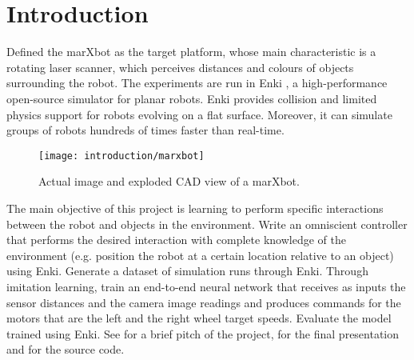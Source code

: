 \section{Introduction}
Defined the marXbot \cite{bonani2010marxbot} as the target platform, whose main 
characteristic is a rotating laser scanner, which perceives distances and 
colours of objects surrounding the robot. The experiments are run in Enki  
\cite{enki}, a high-performance open-source simulator for planar robots. Enki 
provides collision and limited physics support for robots evolving on a flat 
surface. 
Moreover, it can simulate groups of robots hundreds of times faster than real-time.

\begin{figure}[htbp]
	\centerline{\texttt{[image: introduction/marxbot]}}
	\caption{Actual image and exploded CAD view of a marXbot.}
	\label{fig:marxbot}
\end{figure}

The main objective of this project is learning to perform specific interactions between the robot and objects in the 
environment.
Write an omniscient controller that performs the desired interaction with complete knowledge of the environment (e.g. 
position the robot at a certain location relative to an object) using Enki.
Generate a dataset of simulation runs through Enki. 
Through imitation learning, train an end-to-end neural network that receives as inputs the sensor distances and the 
camera image readings and produces commands for the motors that are the left and the right wheel target speeds.
Evaluate the model trained using Enki.
See \cite{pitch} for a brief pitch of the project, \cite{final-pitch} for the 
final presentation and \cite{github} for the source code. 
